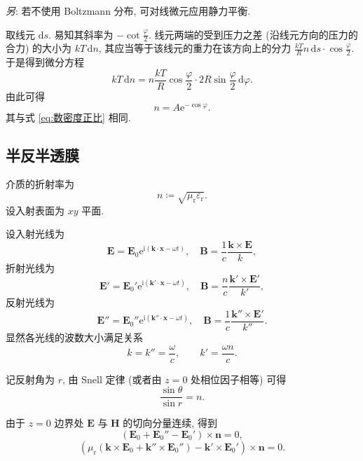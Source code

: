 \documentclass{article}
\begin{document}
\textit{另}: 若不使用 Boltzmann 分布, 可对线微元应用静力平衡.

取线元 $\mathrm ds$.
易知其斜率为 $-\cot\frac\varphi2$.
线元两端的受到压力之差 (沿线元方向的压力的合力) 的大小为 $kT\,\mathrm dn$,
其应当等于该线元的重力在该方向上的分力 $\frac{kT}{R}n\,\mathrm ds\cdot\cos\frac\varphi2$.
于是得到微分方程
\begin{equation}
	kT\,\mathrm dn=n\frac{kT}R\cos\frac\varphi2\cdot2R\sin\frac\varphi2\,\mathrm d\varphi.
\end{equation}
由此可得
\begin{equation}
	n=A\mathrm e^{-\cos\varphi}.
\end{equation}
其与式 \ref{eq:数密度正比} 相同.

\subsection{半反半透膜}

介质的折射率为
\begin{equation}
	n\coloneqq\sqrt{\mu_\mathrm r\varepsilon_\mathrm r}.
\end{equation}
设入射表面为 $xy$ 平面.

设入射光线为
\begin{equation}
	\mathbf E=\mathbf E_0\mathrm e^{\mathrm i\left(\mathbf k\cdot\mathbf x-\omega t\right)},
	\quad\mathbf B=\frac1c\frac{\mathbf k\times\mathbf E}{k},
\end{equation}
折射光线为
\begin{equation}
	\mathbf E'=\mathbf E_0'\mathrm e^{\mathrm i\left(\mathbf k'\cdot\mathbf x-\omega t\right)},
	\quad\mathbf B=\frac nc\frac{\mathbf k'\times\mathbf E'}{k'},
\end{equation}
反射光线为
\begin{equation}
	\mathbf E''=\mathbf E_0''\mathrm e^{\mathrm i\left(\mathbf k''\cdot\mathbf x-\omega t\right)},
	\quad\mathbf B=\frac1c\frac{\mathbf k''\times\mathbf E'}{k''}.
\end{equation}
显然各光线的波数大小满足关系
\begin{equation}
	\label{eq:波数关系}
	k=k''=\frac\omega c,\qquad k'=\frac{\omega n}c.
\end{equation}

记反射角为 $r$, 由 Snell 定律 (或者由 $z=0$ 处相位因子相等) 可得
\begin{equation}
	\frac{\sin\theta}{\sin r}=n.
\end{equation}

由于 $z=0$ 边界处 $\mathbf E$ 与 $\mathbf H$ 的切向分量连续, 得到
\begin{equation}
	\label{eq:边界3}
	\left(\mathbf E_0+\mathbf E_0''-\mathbf E_0'\right)\times\mathbf n=0,
\end{equation}
\begin{equation}
	\label{eq:边界4}
	\left(\mu_\mathrm r\left(\mathbf k\times\mathbf E_0+\mathbf k''\times\mathbf E_0''\right)-\mathbf k'\times\mathbf E_0'\right)\times\mathbf n=0.
\end{equation}
\end{document}
